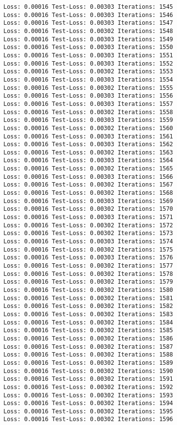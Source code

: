 \documentclass[11pt]{article}
\begin{document}
\begin{Verbatim}[commandchars=\\\{\}]
Loss: 0.00016 Test-Loss: 0.00303 Iterations: 1545
Loss: 0.00016 Test-Loss: 0.00303 Iterations: 1546
Loss: 0.00016 Test-Loss: 0.00303 Iterations: 1547
Loss: 0.00016 Test-Loss: 0.00302 Iterations: 1548
Loss: 0.00016 Test-Loss: 0.00303 Iterations: 1549
Loss: 0.00016 Test-Loss: 0.00303 Iterations: 1550
Loss: 0.00016 Test-Loss: 0.00303 Iterations: 1551
Loss: 0.00016 Test-Loss: 0.00303 Iterations: 1552
Loss: 0.00016 Test-Loss: 0.00302 Iterations: 1553
Loss: 0.00016 Test-Loss: 0.00303 Iterations: 1554
Loss: 0.00016 Test-Loss: 0.00302 Iterations: 1555
Loss: 0.00016 Test-Loss: 0.00303 Iterations: 1556
Loss: 0.00016 Test-Loss: 0.00303 Iterations: 1557
Loss: 0.00016 Test-Loss: 0.00302 Iterations: 1558
Loss: 0.00016 Test-Loss: 0.00303 Iterations: 1559
Loss: 0.00016 Test-Loss: 0.00302 Iterations: 1560
Loss: 0.00016 Test-Loss: 0.00303 Iterations: 1561
Loss: 0.00016 Test-Loss: 0.00303 Iterations: 1562
Loss: 0.00016 Test-Loss: 0.00302 Iterations: 1563
Loss: 0.00016 Test-Loss: 0.00303 Iterations: 1564
Loss: 0.00016 Test-Loss: 0.00302 Iterations: 1565
Loss: 0.00016 Test-Loss: 0.00303 Iterations: 1566
Loss: 0.00016 Test-Loss: 0.00302 Iterations: 1567
Loss: 0.00016 Test-Loss: 0.00302 Iterations: 1568
Loss: 0.00016 Test-Loss: 0.00303 Iterations: 1569
Loss: 0.00016 Test-Loss: 0.00302 Iterations: 1570
Loss: 0.00016 Test-Loss: 0.00303 Iterations: 1571
Loss: 0.00016 Test-Loss: 0.00302 Iterations: 1572
Loss: 0.00016 Test-Loss: 0.00302 Iterations: 1573
Loss: 0.00016 Test-Loss: 0.00303 Iterations: 1574
Loss: 0.00016 Test-Loss: 0.00302 Iterations: 1575
Loss: 0.00016 Test-Loss: 0.00303 Iterations: 1576
Loss: 0.00016 Test-Loss: 0.00302 Iterations: 1577
Loss: 0.00016 Test-Loss: 0.00302 Iterations: 1578
Loss: 0.00016 Test-Loss: 0.00302 Iterations: 1579
Loss: 0.00016 Test-Loss: 0.00302 Iterations: 1580
Loss: 0.00016 Test-Loss: 0.00302 Iterations: 1581
Loss: 0.00016 Test-Loss: 0.00302 Iterations: 1582
Loss: 0.00016 Test-Loss: 0.00302 Iterations: 1583
Loss: 0.00016 Test-Loss: 0.00302 Iterations: 1584
Loss: 0.00016 Test-Loss: 0.00302 Iterations: 1585
Loss: 0.00016 Test-Loss: 0.00302 Iterations: 1586
Loss: 0.00016 Test-Loss: 0.00302 Iterations: 1587
Loss: 0.00016 Test-Loss: 0.00302 Iterations: 1588
Loss: 0.00016 Test-Loss: 0.00302 Iterations: 1589
Loss: 0.00016 Test-Loss: 0.00302 Iterations: 1590
Loss: 0.00016 Test-Loss: 0.00302 Iterations: 1591
Loss: 0.00016 Test-Loss: 0.00302 Iterations: 1592
Loss: 0.00016 Test-Loss: 0.00302 Iterations: 1593
Loss: 0.00016 Test-Loss: 0.00302 Iterations: 1594
Loss: 0.00016 Test-Loss: 0.00302 Iterations: 1595
Loss: 0.00016 Test-Loss: 0.00302 Iterations: 1596

\end{Verbatim}
\end{document}
